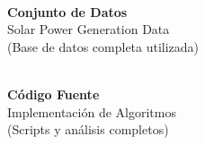 \documentclass[12pt,a4paper]{article}
\begin{document}
\vspace{0.5cm}
\begin{center}
\begin{minipage}{0.4\textwidth}
\centering
{}\\
\vspace{0.2cm}
\textbf{Conjunto de Datos}\\
Solar Power Generation Data\\
(Base de datos completa utilizada)
\end{minipage}
\hfill
\begin{minipage}{0.4\textwidth}
\centering
{}\\
\vspace{0.2cm}
\textbf{Código Fuente}\\
Implementación de Algoritmos\\
(Scripts y análisis completos)
\end{minipage}
\end{center}
\end{document}
